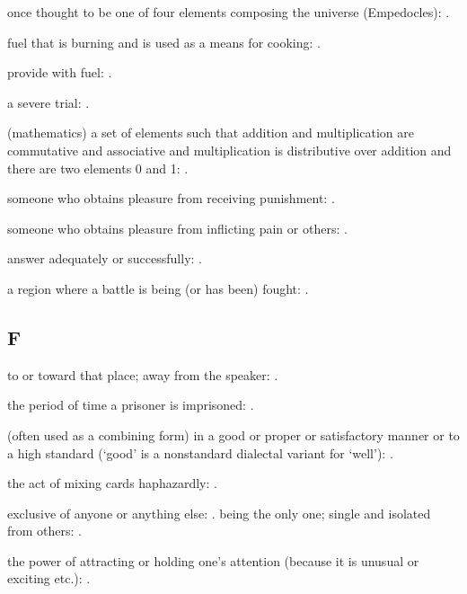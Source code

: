   once thought to be one of four elements composing the universe (Empedocles): .

  fuel that is burning and is used as a means for cooking: .

  provide with fuel:   .

  a severe trial: .

  (mathematics) a set of elements such that addition and multiplication are commutative and associative and multiplication is distributive over addition and there are two elements 0 and 1: .

  someone who obtains pleasure from receiving punishment: .

  someone who obtains pleasure from inflicting pain or others: .

  answer adequately or successfully: .

  a region where a battle is being (or has been) fought:   .

\subsection*{F}

  to or toward that place; away from the speaker:   .

  the period of time a prisoner is imprisoned:   .

  (often used as a combining form) in a good or proper or satisfactory manner or to a high standard (`good' is a nonstandard dialectal variant for `well'):   .

  the act of mixing cards haphazardly:   .

  exclusive of anyone or anything else:   . being the only one; single and isolated from others:   .

  the power of attracting or holding one's attention (because it is unusual or exciting etc.):   .

